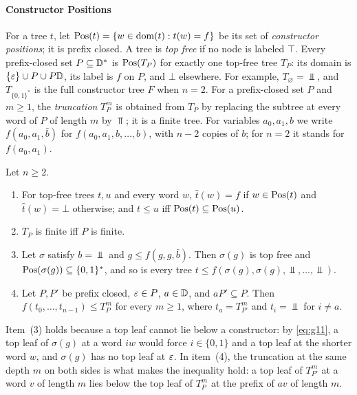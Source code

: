 \paragraph{Constructor Positions}
For a tree $t$, let $\operatorname{Pos}(t)=\{w\in\operatorname{dom}(t):t(w)=f\}$ be its
set of \emph{constructor positions}; it is prefix closed. A tree is
\emph{top free} if no node is labeled $\top$. Every prefix-closed set
$P\subseteq\mathbb{D}^*$ is $\operatorname{Pos}(T_P)$ for exactly one top-free tree $T_P$: its
domain is $\{\varepsilon\}\cup P\cup P\mathbb{D}$, its label is $f$ on $P$, and $\bot$
elsewhere. For example, $T_\varnothing=\Bot$, and $T_{\{0,1\}^*}$ is the
full constructor tree $F$ when $n=2$. For a prefix-closed set $P$ and
$m\ge1$, the \emph{truncation} $T_P^m$ is obtained from $T_P$ by replacing the
subtree at every word of $P$ of length $m$ by $\Top$; it is a finite tree.
For variables $a_0,a_1,b$ we write $f(a_0,a_1,\bar b)$ for
$f(a_0,a_1,b,\ldots,b)$, with $n-2$ copies of $b$; for $n=2$ it stands for
$f(a_0,a_1)$.

\begin{lemma}\label{lem:cx-topfree}
Let $n\ge2$.
\begin{enumerate}[leftmargin=*]
\item For top-free trees $t,u$ and every word $w$, $\widehat t(w)=f$ if
  $w\in\operatorname{Pos}(t)$ and $\widehat t(w)=\bot$ otherwise; and $t\le u$ iff
  $\operatorname{Pos}(t)\subseteq\operatorname{Pos}(u)$.
\item $T_P$ is finite iff $P$ is finite.
\item Let $\sigma$ satisfy $b=\Bot$ and $g\le f(g,g,\bar b)$. Then
  $\sigma(g)$ is top free and $\operatorname{Pos}(\sigma(g))\subseteq\{0,1\}^*$, and so is
  every tree $t\le f(\sigma(g),\sigma(g),\Bot,\ldots,\Bot)$.
\item Let $P,P'$ be prefix closed, $\varepsilon\in P$, $a\in\mathbb{D}$, and
  $aP'\subseteq P$. Then $f(t_0,\ldots,t_{n-1})\le T_P^m$ for every $m\ge1$,
  where $t_a=T_{P'}^m$ and $t_i=\Bot$ for $i\ne a$.
\end{enumerate}
\end{lemma}

Item~(3) holds because a top leaf cannot lie below a constructor: by
\eqref{eq:g11}, a top leaf of $\sigma(g)$ at a word $iw$ would force
$i\in\{0,1\}$ and a top leaf at the shorter word $w$, and $\sigma(g)$ has no
top leaf at $\varepsilon$. In item~(4), the truncation at the same depth $m$ on both
sides is what makes the inequality hold: a top leaf of $T_{P'}^m$ at a word
$v$ of length $m$ lies below the top leaf of $T_P^m$ at the prefix of $av$ of
length $m$.

